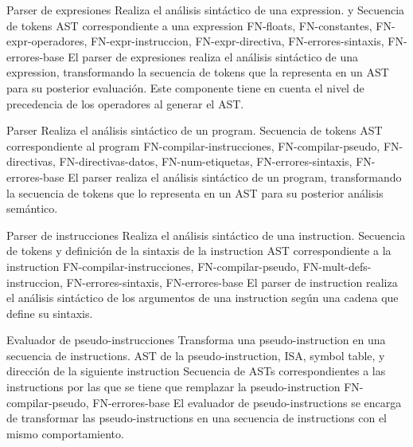 \begin{component}{Parser de expresiones}
    {Realiza el análisis sintáctico de una \gls{expression}.} %
    { y } %
    {Secuencia de \glspl{token}} %
    {\gls{AST} correspondiente a una \gls{expression}} %
    {FN-floats, FN-constantes, FN-expr-operadores,
    FN-expr-instruccion, FN-expr-directiva, FN-errores-sintaxis, FN-errores-base} %
    El \gls{parser} de expresiones realiza el análisis sintáctico de una
    \gls{expression}, transformando la secuencia de \glspl{token} que la
    representa en un \gls{AST} para su posterior evaluación. Este componente
    tiene en cuenta el nivel de precedencia de los operadores al generar el
    \gls{AST}.
\end{component}

\begin{component}{Parser}
    {Realiza el análisis sintáctico de un \gls{program}.} %
    {} %
    {Secuencia de \glspl{token}} %
    {\gls{AST} correspondiente al \gls{program}} %
    {FN-compilar-instrucciones, FN-compilar-pseudo, FN-directivas,
    FN-directivas-datos, FN-num-etiquetas, FN-errores-sintaxis, FN-errores-base} %
    El \gls{parser} realiza el análisis sintáctico de un \gls{program},
    transformando la secuencia de \glspl{token} que lo representa en un
    \gls{AST} para su posterior análisis semántico.
\end{component}

\begin{component}{Parser de instrucciones}
    {Realiza el análisis sintáctico de una \gls{instruction}.} %
    {} %
    {Secuencia de \glspl{token} y definición de la sintaxis de la \gls{instruction}} %
    {\gls{AST} correspondiente a la \gls{instruction}} %
    {FN-compilar-instrucciones, FN-compilar-pseudo,
    FN-mult-defs-instruccion, FN-errores-sintaxis, FN-errores-base} %
    El \gls{parser} de \gls{instruction} realiza el análisis sintáctico de los
    argumentos de una \gls{instruction} según una cadena que define su sintaxis.
\end{component}

\begin{component}{Evaluador de pseudo-instrucciones}
    {Transforma una \gls{pseudo-instruction} en una secuencia de \glspl{instruction}.} %
    {} %
    {\gls{AST} de la \gls{pseudo-instruction}, \gls{ISA}, \gls{symbol table}, y dirección de la siguiente \gls{instruction}} %
    {Secuencia de \glspl{AST} correspondientes a las \glspl{instruction} por las que se tiene que remplazar la \gls{pseudo-instruction}} %
    {FN-compilar-pseudo, FN-errores-base} %
    El evaluador de \glspl{pseudo-instruction} se encarga de transformar las
    \glspl{pseudo-instruction} en una secuencia de \glspl{instruction} con el
    mismo comportamiento.
\end{component}


